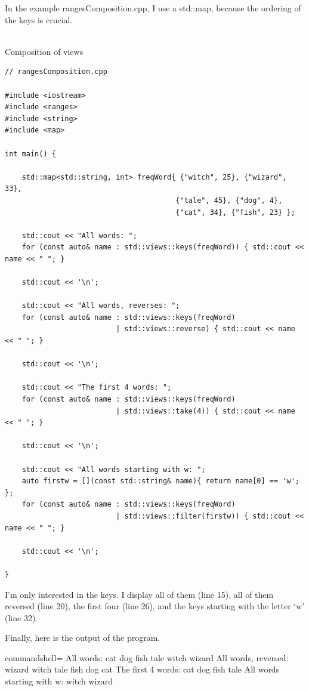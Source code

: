 
In the example rangesComposition.cpp, I use a std::map, because the ordering of the keys is crucial.

\hspace*{\fill} \\ %
\noindent
Composition of views
\begin{lstlisting}[style=styleCXX]
// rangesComposition.cpp

#include <iostream>
#include <ranges>
#include <string>
#include <map>

int main() {
	
	std::map<std::string, int> freqWord{ {"witch", 25}, {"wizard", 33},
										{"tale", 45}, {"dog", 4},
										{"cat", 34}, {"fish", 23} };
	
	std::cout << "All words: ";
	for (const auto& name : std::views::keys(freqWord)) { std::cout << name << " "; }
	
	std::cout << '\n';
	
	std::cout << "All words, reverses: ";
	for (const auto& name : std::views::keys(freqWord)
	                      | std::views::reverse) { std::cout << name << " "; }
	
	std::cout << '\n';
	
	std::cout << "The first 4 words: ";
	for (const auto& name : std::views::keys(freqWord)
	                      | std::views::take(4)) { std::cout << name << " "; }
	
	std::cout << '\n';
	
	std::cout << "All words starting with w: ";
	auto firstw = [](const std::string& name){ return name[0] == 'w'; };
	for (const auto& name : std::views::keys(freqWord)
	                      | std::views::filter(firstw)) { std::cout << name << " "; }
	
	std::cout << '\n';

}
\end{lstlisting}

I’m only interested in the keys. I display all of them (line 15), all of them reversed (line 20), the first four (line 26), and the keys starting with the letter ‘w’ (line 32).

Finally, here is the output of the program.

\begin{tcblisting}{commandshell={}}
All words: cat dog fish tale witch wizard
All words, reversed: wizard witch tale fish dog cat
The first 4 words: cat dog fish tale
All words starting with w: witch wizard
\end{tcblisting}

